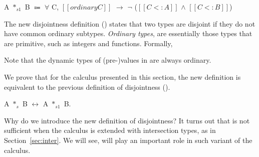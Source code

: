 \begin{definition}
    A $*_{s1}$ B $\Coloneqq$ $\forall$ C, $[[ordinary C]]$ $\rightarrow$ $\neg$ ($[[C <: A]]$ $\wedge$ $[[C <: B]]$)
    \label{def:union:disj1}
  \end{definition}

\noindent
The new disjointness definition () states that two
types are disjoint if they do not have common ordinary subtypes.
\emph{Ordinary types}, are essentially
those types that are primitive, such as integers and functions. Formally,

\medskip

\noindent Note that the dynamic types of (pre-)values in \name are always ordinary.

We prove that for the calculus presented in this section, the new definition is
equivalent to the previous definition of disjointness
().

\begin{lemma}
A $*_{s}$ B $\longleftrightarrow$ A $*_{s1}$ B.
\end{lemma}

Why do we introduce the new definition of disjointness? It turns out that
 is not sufficient when the calculus is extended with
intersection types, as in Section~\ref{sec:inter}. We will see,
 will play an important role in such variant of the calculus.

